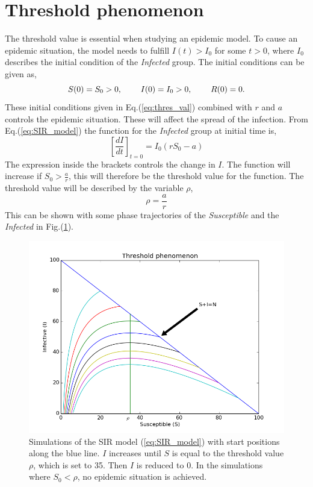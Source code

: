 \documentclass[%
twoside,                 %
final,                   %
chapterprefix=true,      %
open=right               %
10pt]{book}
\begin{document}
\section{Threshold phenomenon}
\label{section:1threshold_phenomenon}
The threshold value is essential when studying an epidemic model. To cause an epidemic situation, the model needs to fulfill $I(t)> I_0$ for some $t>0$, where $I_0$ describes the initial condition of  the \emph{Infected} group. The initial conditions can be given as,
\begin{equation} \label{eq:thres_val}
S(0)=S_0 > 0,\hspace{8mm} I(0)=I_0>0,\hspace{8mm} R(0) =0.
\end{equation}
These initial conditions given in Eq.(\ref{eq:thres_val}) combined with $r$ and $a$ controls the epidemic situation. These will affect the spread of the infection. From Eq.(\ref{eq:SIR_model}) the function for the \emph{Infected} group at initial time is,
\begin{equation}
\left[\frac{dI}{dt}\right]_{t=0} = I_0(rS_0-a)
\end{equation}
The expression inside the brackets controls the change in $I$. The function will increase if $S_0 > \frac{a}{r}$, this will therefore be the threshold value for the function. The threshold value will be described by the variable $\rho$,
\begin{equation} \label{eq:threshold_value}
\rho = \frac{a}{r}
\end{equation}
This can be shown with some phase trajectories of the \emph{Susceptible} and the \emph{Infected} in Fig.(\ref{fig:threshold_phenomenon}).  


\begin{figure}[ht]
  \centerline{\includegraphics[width=0.8\linewidth]{1_fig/threshold_phenomenon.png}}
  \caption{
  \label{fig:threshold_phenomenon} Simulations of the SIR model (\ref{eq:SIR_model}) with start positions along the blue line. $I$ increases until $S$ is equal to the threshold value $\rho$, which is set to 35. Then $I$ is reduced to 0. In the simulations where $S_0 < \rho$, no epidemic situation is achieved.
  }
\end{figure}
\end{document}
